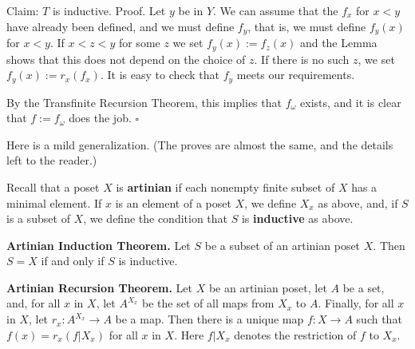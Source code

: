 \documentclass[12pt,letterpaper]{article}
\newcommand{\nn}{\noindent}
\begin{document}
\nn Claim: $T$ is inductive. Proof. Let $y$ be in $Y$. We can assume that the $f_x$ for $x<y$ have already been defined, and we must define $f_y$, that is, we must define $f_y(x)$ for $x<y$. If $x<z<y$ for some $z$ we set $f_y(x):=f_z(x)$ and the Lemma shows that this does not depend on the choice of $z$. If there is no such $z$, we set $f_y(x):=r_x(f_x)$. It is easy to check that $f_y$ meets our requirements. 

By the Transfinite Recursion Theorem, this implies that $f_\omega$ exists, and it is clear that $f:=f_\omega$ does the job. $\square$ 

Here is a mild generalization. (The proves are almost the same, and the details left to the reader.) 

Recall that a poset $X$ is \textbf{artinian} if each nonempty finite subset of $X$ has a minimal element. If $x$ is an element of a poset $X$, we define $X_x$ as above, and, if $S$ is a subset of $X$, we define the condition that $S$ is \textbf{inductive} as above. 


\nn\textbf{Artinian Induction Theorem.} Let $S$ be a subset of an artinian poset $X$. Then $S=X$ if and only if $S$ is inductive. 

\nn\textbf{Artinian Recursion Theorem.} Let $X$ be an artinian poset, let $A$ be a set, and, for all $x$ in $X$, let $A^{X_x}$ be the set of all maps from $X_x$ to $A$. Finally, for all $x$ in $X$, let $r_x:A^{X_x}\to A$ be a map. Then there is a unique map $f:X\to A$ such that $f(x)=r_x(f|X_x)$ for all $x$ in $X$. Here $f|X_x$ denotes the restriction of $f$ to $X_x$. 
\end{document}
